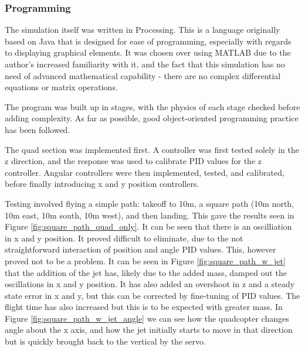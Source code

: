 \documentclass[11pt]{article}
\begin{document}
\subsubsection{Programming}
The simulation itself was written in Processing. This is a language originally based on Java that is designed for ease of programming, especially with regards to displaying graphical elements. It was chosen over using MATLAB due to the author's increased familiarity with it, and the fact that this simulation has no need of advanced mathematical capability - there are no complex differential equations or matrix operations.

The program was built up in stages, with the physics of each stage checked before adding complexity. As far as possible, good object-oriented programming practice has been followed.

The quad section was implemented first. A controller was first tested solely in the z direction, and the response was used to calibrate PID values for the z controller. Angular controllers were then implemented, tested, and calibrated, before finally introducing x and y position controllers.

Testing involved flying a simple path: takeoff to 10m, a square path (10m north, 10m east, 10m south, 10m west), and then landing. This gave the results seen in Figure \ref{fig:square_path_quad_only}. It can be seen that there is an oscilliation in x and y position. It proved difficult to eliminate, due to the not straightforward interaction of position and angle PID values. This, however proved not to be a problem. It can be seen in Figure \ref{fig:square_path_w_jet} that the addition of the jet has, likely due to the added mass, damped out the oscillations in x and y position. It has also added an overshoot in z and a steady state error in x and y, but this can be corrected by fine-tuning of PID values. The flight time has also increased but this is to be expected with greater mass. In Figure \ref{fig:square_path_w_jet_angle} we can see how the quadcopter changes angle about the x axis, and how the jet initially starts to move in that direction but is quickly brought back to the vertical by the servo.
\end{document}
